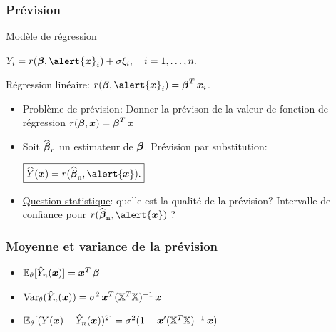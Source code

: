 \begin{frame}
\frametitle{Prévision}

Modèle de régression \vspace{2mm} \centerline{$ Y_i=
r(\truebeta, \alert{\bx}_i)+ \sigma \xi_i, \quad i=1,\dots,n.$}
Régression
\alert{linéaire}: $r(\truebeta, \alert{\bx}_i)=\truebeta^T
\bx_i$.
\begin{itemize}
\item \alert{Problème de prévision}:
Donner la prévison de la valeur de fonction de
régression $r(\boldsymbol{\beta},  \operatorname{\boldsymbol{x}})=\boldsymbol{\beta}^T \operatorname{\boldsymbol{x}}$\\
\item Soit $\operatorname{\widehat{\boldsymbol{\beta}}_n}$ un estimateur de $\boldsymbol{\beta}$. \alert{Prévision par
substitution:}
 \centerline{$\boxed{ \widehat Y(\bx) = r(\estregress, \alert{\bx}).}$}
\item \underline{Question statistique}: quelle est la qualité de la prévision?
\alert{Intervalle de confiance} pour $r(\estregress, \alert{\bx})$ ?
\end{itemize}
\end{frame}



\begin{frame}
\frametitle{Moyenne et variance de la prévision}
\begin{theorem}
\begin{itemize}
\item \alert<1>{$\operatorname{{\mathbb E}}_{\theta}[\hat{Y}_n(\operatorname{\boldsymbol{x}})]= \operatorname{\boldsymbol{x}}^T \boldsymbol{\beta}$}
\item \alert<2>{$\operatorname{\mathrm{Var}}_{\theta}(\hat{Y}_n(\operatorname{\boldsymbol{x}}))= \sigma^2 \operatorname{\boldsymbol{x}}^T (\mathbb{X}^T \mathbb{X})^{-1} \operatorname{\boldsymbol{x}}$}
\item \alert<3>{$\operatorname{{\mathbb E}}_{\theta}[ (Y(\operatorname{\boldsymbol{x}}) - \hat{Y}_n(\operatorname{\boldsymbol{x}}))^2]= \sigma^2 (1 + \operatorname{\boldsymbol{x}}' (\mathbb{X}^T \mathbb{X})^{-1} \operatorname{\boldsymbol{x}})$}
\end{itemize}
\end{theorem}
\end{frame}



